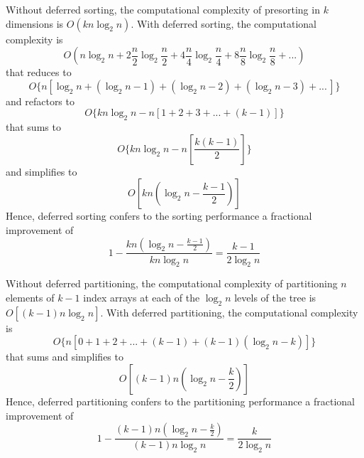 \documentclass{sig-alternate}
\begin{document}
Without deferred sorting, the computational complexity of presorting in $k$ dimensions is $O\left(kn \log_2 n\right)$. With deferred sorting, the computational complexity is
\begin{equation*}
O\left( n \log_2 n + 2 \frac{n}{2} \log_2 \frac{n}{2} + 4 \frac{n}{4} \log_2 \frac{n}{4} + 8 \frac{n}{8} \log_2 \frac{n}{8} + ... \right)
\end{equation*}
that reduces to
\begin{equation*}
O\{ n\left[ \log_2 n + \left(\log_2 n - 1\right) + \left(\log_2 n - 2\right) + \left(\log_2 n - 3\right) + ... \, \right] \}
\end{equation*}
and refactors to
\begin{equation*}
O\{ kn \log_2 n - n \left[1 + 2 + 3 + ... + \left(k - 1 \right) \right] \}
\end{equation*}
that sums to
\begin{equation*}
O\{ kn \log_2 n - n \left[ \frac{ k \left(k - 1 \right) }{2} \right] \}
\end{equation*}
and simplifies to
\begin{equation*}
O\left[ kn \left( \log_2 n - \frac{k - 1}{2} \right) \right]
\end{equation*}
Hence, deferred sorting confers to the sorting performance a fractional improvement of
\begin{equation}
\label{eq:presort4}
1 - \frac{ kn \left( \log_2 n - \frac{k-1}{2} \right) }{ kn \log_2 n } = \frac{k - 1}{2 \log_2 n}
\end{equation}

Without deferred partitioning, the computational complexity of partitioning $n$ elements of $k-1$ index arrays at each of the $\log_2 n$ levels of the tree is $O\left[\left(k - 1\right)n \log_2 n\right]$. With deferred partitioning, the computational complexity is
\begin{equation*}
O\{ n \left[ 0 + 1 + 2 + ... + \left(k - 1\right) + \left(k - 1\right) \left( \log_2 n - k \right) \right] \}
\end{equation*}
that sums and simplifies to
\begin{equation*}
O\left[ \left(k - 1\right) n \left( \log_2 n - \frac{k}{2} \right) \right]
\end{equation*}
Hence, deferred partitioning confers to the partitioning performance a fractional improvement of
\begin{equation}
\label{eq:partition3}
1 - \frac{ \left(k - 1\right) n \left( \log_2 n - \frac{k}{2} \right) }{ \left(k - 1\right) n \log_2 n } = \frac{k}{2 \log_2 n}
\end{equation}
\end{document}
